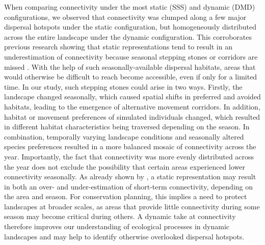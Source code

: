 \documentclass[../FinalThesis.tex]{subfiles}
\begin{document}
When comparing connectivity under the most static (SSS) and dynamic (DMD)
configurations, we observed that connectivity was clumped along a few major
dispersal hotspots under the static configuration, but homogeneously distributed
across the entire landscape under the dynamic configuration. This corroborates
previous research showing that static representations tend to result in an
underestimation of connectivity because seasonal stepping stones or corridors
are missed \citep{Martensen.2017}. With the help of such seasonally-available
dispersal habitats, areas that would otherwise be difficult to reach become
accessible, even if only for a limited time. In our study, such stepping stones
could arise in two ways. Firstly, the landscape changed seasonally, which caused
spatial shifts in preferred and avoided habitats, leading to the emergence of
alternative movement corridors. In addition, habitat or movement preferences of
simulated individuals changed, which resulted in different habitat
characteristics being traversed depending on the season. In combination,
temporally varying landscape conditions and seasonally altered species
preferences resulted in a more balanced mosaic of connectivity across the year.
Importantly, the fact that connectivity was more evenly distributed across the
year does not exclude the possibility that certain areas experienced lower
connectivity seasonally. As already shown by \citet{Osipova.2019}, a static
representation may result in both an over- and under-estimation of short-term
connectivity, depending on the area and season. For conservation planning, this
implies a need to protect landscapes at broader scales, as areas that provide
little connectivity during some season may become critical during others. A
dynamic take at connectivity therefore improves our understanding of ecological
processes in dynamic landscapes and may help to identify otherwise overlooked
dispersal hotspots.

\end{document}
